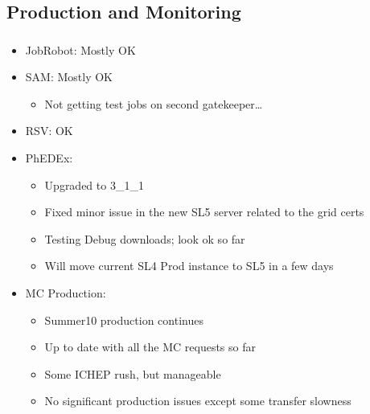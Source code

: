 \documentclass{beamer}
\begin{document}
\subsection{Production and Monitoring}
\begin{frame}
\frametitle{}

\begin{itemize}
	\item JobRobot: Mostly OK
	\item SAM: Mostly OK
	\begin{itemize}
		\item Not getting test jobs on second gatekeeper\ldots{}
	\end{itemize}
	\item RSV: OK
	\item PhEDEx:
	\begin{itemize}
		\item Upgraded to 3\_1\_1
		\item Fixed minor issue in the new SL5 server related to the grid certs
		\item Testing Debug downloads; look ok so far
		\item Will move current SL4 Prod instance to SL5 in a few days
	\end{itemize}
	\item MC Production:
	\begin{itemize}
		\item Summer10 production continues
		\item Up to date with all the MC requests so far
		\item Some ICHEP rush, but manageable
		\item No significant production issues except some transfer slowness
	\end{itemize}
\end{itemize}
\end{frame}
\end{document}
